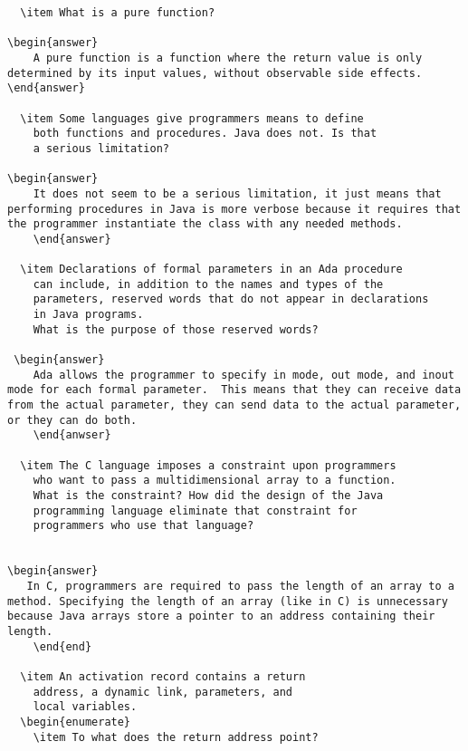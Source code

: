 \begin{enumerate}
\begin{answer}
\begin{lstlisting}
  \item What is a pure function?

\begin{answer}
    A pure function is a function where the return value is only determined by its input values, without observable side effects.
\end{answer}

  \item Some languages give programmers means to define
    both functions and procedures. Java does not. Is that
    a serious limitation?

\begin{answer}
    It does not seem to be a serious limitation, it just means that performing procedures in Java is more verbose because it requires that the programmer instantiate the class with any needed methods.
    \end{answer}

  \item Declarations of formal parameters in an Ada procedure
    can include, in addition to the names and types of the
    parameters, reserved words that do not appear in declarations
    in Java programs. 
    What is the purpose of those reserved words?
 
 \begin{answer}
    Ada allows the programmer to specify in mode, out mode, and inout mode for each formal parameter.  This means that they can receive data from the actual parameter, they can send data to the actual parameter, or they can do both.
    \end{anwser}

  \item The C language imposes a constraint upon programmers
    who want to pass a multidimensional array to a function.
    What is the constraint? How did the design of the Java
    programming language eliminate that constraint for 
    programmers who use that language?


\begin{answer}
   In C, programmers are required to pass the length of an array to a method. Specifying the length of an array (like in C) is unnecessary because Java arrays store a pointer to an address containing their length.
    \end{end}

  \item An activation record contains a return
    address, a dynamic link, parameters, and
    local variables.
  \begin{enumerate}
    \item To what does the return address point?


\end{lstlisting}
\end{answer}
\end{enumerate}
